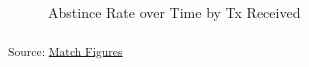 \documentclass[
  letterpaper,
  DIV=11,
  numbers=noendperiod]{scrartcl}
\begin{document}
\begin{figure}[H]


\caption{\label{fig-tx_week_4}Abstince Rate over Time by Tx Received}

\end{figure}%

\textsubscript{Source:
\href{https://jjcurtin.github.io/lectures_science/notebooks/match_figs-preview.html\#cell-fig-tx_week_4}{Match
Figures}}
\end{document}

